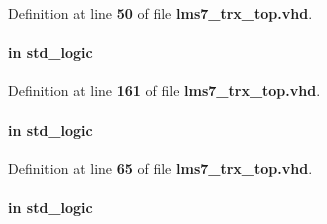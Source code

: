 Definition at line {\bf 50} of file {\bf lms7\+\_\+trx\+\_\+top.\+vhd}.

\paragraph[{P\+W\+R\+\_\+\+S\+RC}]{ {\bfseries \textcolor{keywordflow}{in}\textcolor{vhdlchar}{ }} {\bfseries \textcolor{comment}{std\+\_\+logic}\textcolor{vhdlchar}{ }} \hspace{0.3cm}{\ttfamily [Port]}}\label{classlms7__trx__top_ac8bfdc4c3c8aaeb7e64d93b59f63407b}


Definition at line {\bf 161} of file {\bf lms7\+\_\+trx\+\_\+top.\+vhd}.

\paragraph[{S\+I\+\_\+\+C\+L\+K0}]{ {\bfseries \textcolor{keywordflow}{in}\textcolor{vhdlchar}{ }} {\bfseries \textcolor{comment}{std\+\_\+logic}\textcolor{vhdlchar}{ }} \hspace{0.3cm}{\ttfamily [Port]}}\label{classlms7__trx__top_ad020ecb24a0170f1bee06b51dd64c4b2}


Definition at line {\bf 65} of file {\bf lms7\+\_\+trx\+\_\+top.\+vhd}.

\paragraph[{S\+I\+\_\+\+C\+L\+K1}]{ {\bfseries \textcolor{keywordflow}{in}\textcolor{vhdlchar}{ }} {\bfseries \textcolor{comment}{std\+\_\+logic}\textcolor{vhdlchar}{ }} \hspace{0.3cm}{\ttfamily [Port]}}\label{classlms7__trx__top_a096b4b393c408673866c6a7da370f900}


